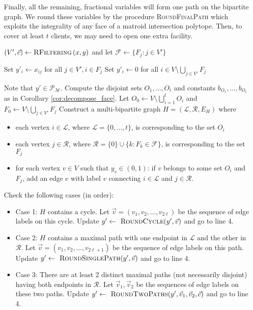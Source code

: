 \documentclass[a4paper,11pt]{article}
\newcommand{\F}{\mathcal{F}}
\newcommand{\R}{\mathcal{R}}
\newcommand{\M}{\mathcal{M}}
\renewcommand{\L}{\mathcal{L}}
\renewcommand{\P}{\mathcal{P}}
\begin{document}
Finally, all the remaining, fractional variables will form one path on the bipartite graph. We round these variables by the procedure \textsc{RoundFinalPath} which exploits the integrality of any face of a matroid intersection polytope. Then, to cover at least $t$ clients, we may need to open one extra facility.

\begin{algorithm}[H]
\caption{$\textsc{PseudoFRMCenterRound}\left(x,y \right)$}
\begin{algorithmic}[1]
\STATE $(V',\vec{c}) \gets \textsc{RFiltering}\left(x,y \right)$ and let $\F \gets \{F_j: j \in V'\}$

\STATE Set $y'_i \gets x_{ij}$ for all $j \in V', i \in F_j$
\STATE Set $y'_i \gets 0$ for all $i \in V \setminus \bigcup_{j \in V'}F_j$

	\STATE Note that $y'\in \P_\M$. Compute the disjoint sets $O_1, \ldots, O_t$ and constants $b_{O_1}, \ldots, b_{O_t}$ as in Corollary \ref{cor:decompose_face}. 
	\STATE Let $O_0 \gets V \setminus \bigcup_{i=1}^t O_i$ and $F_0 \gets V \setminus \bigcup_{j \in V'}F_j  $
	\STATE Construct a multi-bipartite graph $H = (\L, \R, E_H)$ where
	\begin{itemize}[noitemsep,nolistsep] 
		\item each vertex $i \in \L$, where $\L = \{0,\ldots,t\}$, is corresponding to the set $O_i$
		\item each vertex $j \in \R$, where $\R = \{0\} \cup \{k:F_k \in \F\}$, is corresponding to the set $F_j$ 
		\item for each vertex $v \in V$ such that $y_v \in (0,1)$: if $v$ belongs to some set $O_i$ and $F_j$, add an edge $e$ with label $v$ connecting $i \in \L$ and $j \in \R$. 
	\end{itemize}
	\STATE Check the following cases (in order):
	\begin{itemize}[noitemsep,nolistsep] 
		\item Case 1: $H$ contains a cycle. Let $\vec{v} = (v_1, v_2, \ldots, v_{2\ell})$ be the sequence of edge labels on this cycle. Update $y' \gets \textsc{ RoundCycle}(y', \vec{v})$ and go to line 4.
		\item Case 2: $H$ contains a maximal path with one endpoint in $\L$ and the other in $\R$. Let $\vec{v} = (v_1, v_2, \ldots, v_{2\ell+1})$ be the sequence of edge labels on this path. Update $y' \gets \textsc{ RoundSinglePath}(y', \vec{v})$ and go to line 4.
		\item Case 3: There are at least 2 distinct maximal paths (not necessarily disjoint) having both endpoints in $\R$. Let $\vec{v}_1, \vec{v}_2$ be the sequences of edge labels on these two paths. Update $y' \gets \textsc{ RoundTwoPaths}(y', \vec{v}_1, \vec{v}_2, \vec{c})$ and go to line 4.

\end{itemize}
\end{algorithmic}
\end{algorithm}
\end{document}
